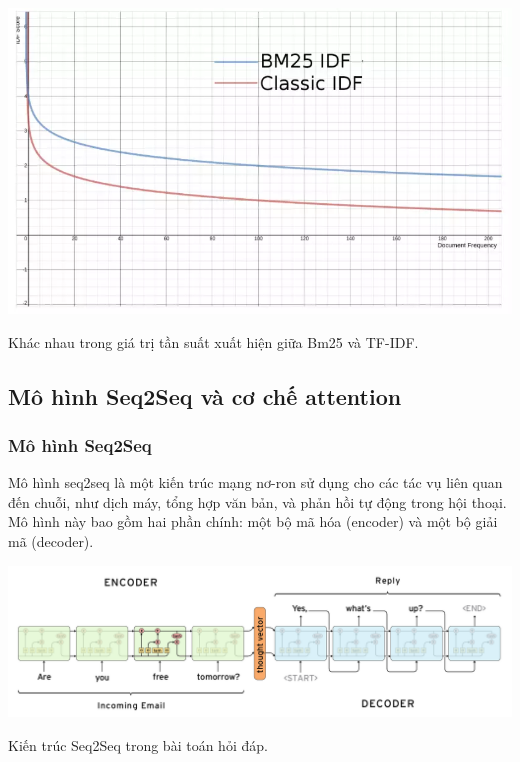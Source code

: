 \documentclass[a4paper, 12pt, openany]{book}
\begin{document}
\begin{minipage}{\linewidth}
    \captionsetup{type=figure}
    \centering
    \includegraphics[width=\linewidth]{./assets/images/bm25.png}
    \caption{Khác nhau trong giá trị tần suất xuất hiện giữa Bm25 và TF-IDF.}
\end{minipage}

\subsection{Mô hình Seq2Seq và cơ chế attention}
\subsubsection{Mô hình Seq2Seq}


Mô hình \ac{seq2seq} là một kiến trúc mạng nơ-ron sử dụng cho các tác vụ liên quan đến chuỗi, như dịch máy, tổng hợp văn bản, và phản hồi tự động trong hội thoại. Mô hình này bao gồm hai phần chính: một bộ mã hóa (encoder) và một bộ giải mã (decoder).

\begin{minipage}{\linewidth}
    \captionsetup{type=figure}
    \centering
    \includegraphics[width=\linewidth]{./assets/images/seq2seq.png}
    \caption{Kiến trúc Seq2Seq trong bài toán hỏi đáp.}
\end{minipage}
\end{document}
